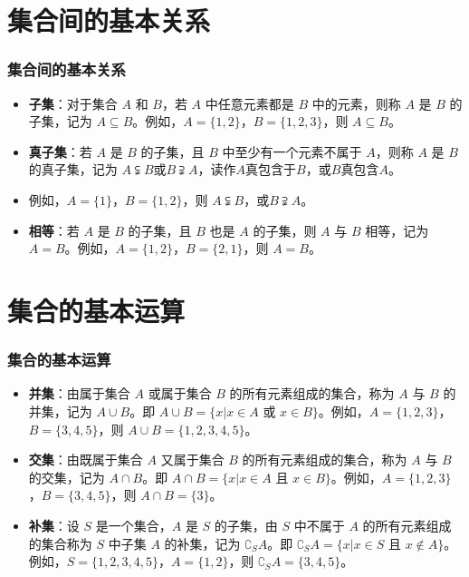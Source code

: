 \documentclass[aspectratio=169]{ctexbeamer} %
\begin{document}
\section{集合间的基本关系}
\begin{frame}
\frametitle{集合间的基本关系}
\begin{itemize}
\item \alert{\textbf{子集}}：对于集合 \(A\) 和 \(B\)，若 \(A\) 中任意元素都是 \(B\) 中的元素，则称 \(A\) 是 \(B\) 的子集，记为 \(A \subseteq B\)。例如，\(A = \{1, 2\}\)，\(B = \{1, 2, 3\}\)，则 \(A \subseteq B\)。\\
\item \alert{\textbf{真子集}}：若 \(A\) 是 \(B\) 的子集，且 \(B\) 中至少有一个元素不属于 \(A\)，则称 \(A\) 是 \(B\) 的真子集，记为 \(A \subsetneqq B\)或\(B \supsetneqq  A \)，读作\(A\)真包含于\(B\)，或\(B\)真包含\(A\)。
\item 例如，\(A = \{1\}\)，\(B = \{1, 2\}\)，则 \(A \subsetneqq B\)，或\(B \supsetneqq  A \)。\\
\item \alert{\textbf{相等}}：若 \(A\) 是 \(B\) 的子集，且 \(B\) 也是 \(A\) 的子集，则 \(A\) 与 \(B\) 相等，记为 \(A = B\)。例如，\(A = \{1, 2\}\)，\(B = \{2, 1\}\)，则 \(A = B\)。
\end{itemize}
\end{frame}

\section{集合的基本运算}
\begin{frame}
\frametitle{集合的基本运算}
\begin{itemize}
\item \textbf{\alert{并集}}：由属于集合 \(A\) 或属于集合 \(B\) 的所有元素组成的集合，称为 \(A\) 与 \(B\) 的并集，记为 \(A \cup B\)。即 \(A \cup B = \{x | x \in A \text{ 或 } x \in B\}\)。例如，\(A = \{1, 2, 3\}\)，\(B = \{3, 4, 5\}\)，则 \(A \cup B = \{1, 2, 3, 4, 5\}\)。\\

\item \textbf{\alert{交集}}：由既属于集合 \(A\) 又属于集合 \(B\) 的所有元素组成的集合，称为 \(A\) 与 \(B\) 的交集，记为 \(A \cap B\)。即 \(A \cap B = \{x | x \in A \text{ 且 } x \in B\}\)。例如，\(A = \{1, 2, 3\}\)，\(B = \{3, 4, 5\}\)，则 \(A \cap B = \{3\}\)。\\

\item \textbf{\alert{补集}}：设 \(S\) 是一个集合，\(A\) 是 \(S\) 的子集，由 \(S\) 中不属于 \(A\) 的所有元素组成的集合称为 \(S\) 中子集 \(A\) 的补集，记为 \(\complement_S A\)。即 \(\complement_S A = \{x | x \in S \text{ 且 } x \notin A\}\)。例如，\(S = \{1, 2, 3, 4, 5\}\)，\(A = \{1, 2\}\)，则 \(\complement_S A = \{3, 4, 5\}\)。
\end{itemize}
\end{frame}
\end{document}
